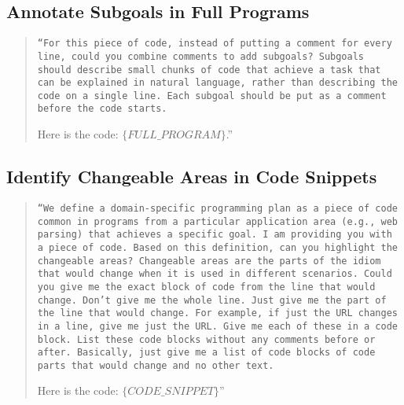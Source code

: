 \subsection{Annotate Subgoals in Full Programs}
\label{sec:subgoals_prompt}


\begin{quote}
    \tt ``For this piece of code, instead of putting a comment for every line, could you combine comments to add subgoals? Subgoals should describe small chunks of code that achieve a task that can be explained in natural language, rather than describing the code on a single line. Each subgoal should be put as a comment before the code starts. 
    
    Here is the code: $\{FULL\_PROGRAM\}$.''
\end{quote}

\subsection{Identify Changeable Areas in Code Snippets} 
\label{sec:ca_prompt}


\begin{quote}
    \tt ``We define a domain-specific programming plan as a piece of code common in programs from a particular application area (e.g., web parsing) that achieves a specific goal. I am providing you with a piece of code. Based on this definition, can you highlight the changeable areas?  Changeable areas are the parts of the idiom that would change when it is used in different scenarios. Could you give me the exact block of code from the line that would change. Don't give me the whole line. Just give me the part of the line that would change. For example, if just the URL changes in a line, give me just the URL. Give me each of these in a code block. List these code blocks without any comments before or after. Basically, just give me a list of code blocks of code parts that would change and no other text. 
    
    Here is the code: $\{CODE\_SNIPPET\}$''
\end{quote}

